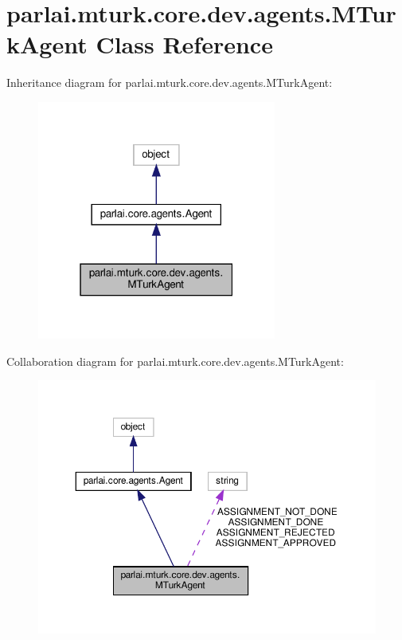\hypertarget{classparlai_1_1mturk_1_1core_1_1dev_1_1agents_1_1MTurkAgent}{}\section{parlai.\+mturk.\+core.\+dev.\+agents.\+M\+Turk\+Agent Class Reference}
\label{classparlai_1_1mturk_1_1core_1_1dev_1_1agents_1_1MTurkAgent}


Inheritance diagram for parlai.\+mturk.\+core.\+dev.\+agents.\+M\+Turk\+Agent\+:
\nopagebreak
\begin{figure}[H]
\begin{center}
\leavevmode
\includegraphics[width=223pt]{classparlai_1_1mturk_1_1core_1_1dev_1_1agents_1_1MTurkAgent__inherit__graph}
\end{center}
\end{figure}


Collaboration diagram for parlai.\+mturk.\+core.\+dev.\+agents.\+M\+Turk\+Agent\+:
\nopagebreak
\begin{figure}[H]
\begin{center}
\leavevmode
\includegraphics[width=350pt]{classparlai_1_1mturk_1_1core_1_1dev_1_1agents_1_1MTurkAgent__coll__graph}
\end{center}
\end{figure}

